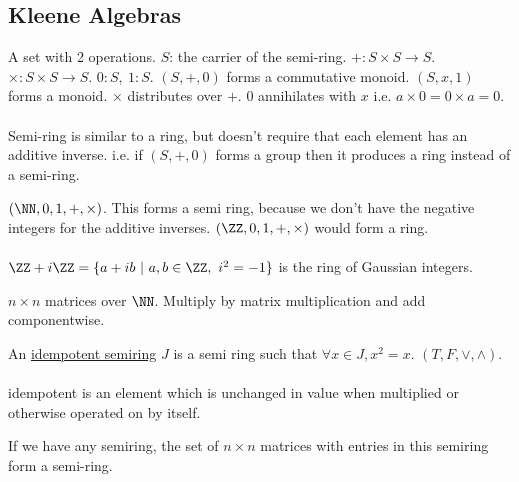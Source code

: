 \documentclass[../598comp.tex]{subfiles}
\begin{document}
\subsection{Kleene Algebras}

\begin{definition}
  A set with 2 operations. $S$: the carrier of the semi-ring. $+: S \times S \to
  S$. $\times: S \times S \to S$. $0: S, \ 1:S$. $(S, +, 0)$ forms a commutative
  monoid. $(S, x, 1)$ forms a monoid. $\times$ distributes over $+$. 0
  annihilates with $x$ i.e. $a \times 0 = 0 \times a = 0$.
  \\\\
  Semi-ring is similar to a ring, but doesn't require that each element has an
  additive inverse. i.e. if $(S, +, 0)$ forms a group then it produces a ring
  instead of a semi-ring.
  \begin{example}
    $(\NN, 0, 1, +, \times)$. This forms a semi ring, because we don't have the
    negative integers for the additive inverses. $(\ZZ, 0, 1, +, \times)$ would
    form a ring.
    \\\\
    $\ZZ + i\ZZ = \{a + ib \ | \ a, b \in \ZZ, \ i^2 = -1\}$ is the ring of
    Gaussian integers.
  \end{example}
  \begin{example}
    $n \times n$ matrices over $\NN$. Multiply by matrix multiplication and add componentwise.
  \end{example}
  \begin{example}
    An \ul{idempotent semiring} $J$ is a semi ring such that $\forall x \in J, x^2 =
    x$. $(T, F, \vee, \wedge)$.
    \\\\
    idempotent is an element which is unchanged in value when multiplied or
    otherwise operated on by itself.
  \end{example}
  \begin{example}
    If we have any semiring, the set of $n \times n$ matrices with entries in this
    semiring form a semi-ring.
  \end{example}

\end{definition}
\end{document}
